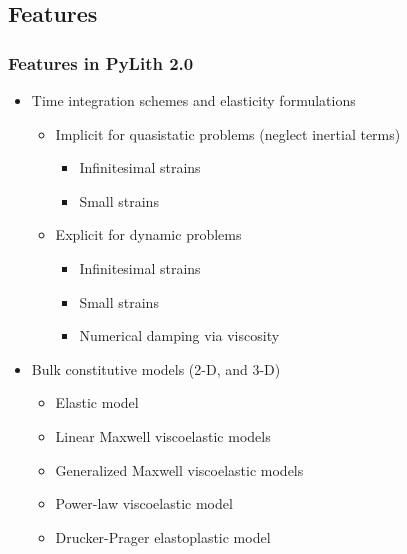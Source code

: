 \documentclass{beamer}
\begin{document}
\subsection{Features}

\begin{frame}
  \frametitle{Features in PyLith 2.0}

  \begin{itemize}
  \item Time integration schemes and elasticity formulations
    \begin{itemize}
    \item Implicit for quasistatic problems (neglect inertial terms)
      \begin{itemize}
      \item Infinitesimal strains
      \item Small strains
      \end{itemize}
    \item Explicit for dynamic problems
      \begin{itemize}
      \item Infinitesimal strains
      \item Small strains
      \item Numerical damping via viscosity
     \end{itemize}
    \end{itemize}
  \item Bulk constitutive models (2-D, and 3-D)
    \begin{itemize}
    \item Elastic model
    \item Linear Maxwell viscoelastic models
    \item Generalized Maxwell viscoelastic models
    \item Power-law viscoelastic model
    \item Drucker-Prager elastoplastic model
    \end{itemize}
 \end{itemize}

\end{frame}
\end{document}
